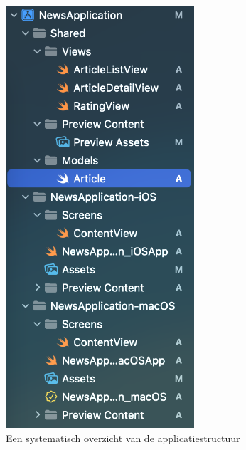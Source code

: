 \begin{figure}[!h]
    \centering
    \includegraphics[width=70mm, scale=0.7]{img/applicatiestructuur.png}
    \caption{Een systematisch overzicht van de applicatiestructuur}
\end{figure}

